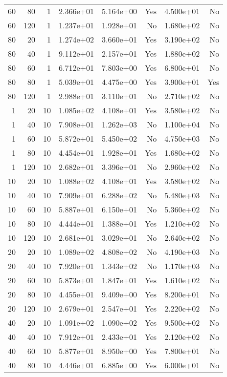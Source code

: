 \begin{table}
\begin{tabular}{rrrrrrrr}
60 & 80 & 1 & 2.366e+01 & 5.164e+00 & Yes & 4.500e+01 & No \\
60 & 120 & 1 & 1.237e+01 & 1.928e+01 & No & 1.680e+02 & No \\
80 & 20 & 1 & 1.274e+02 & 3.660e+01 & Yes & 3.190e+02 & No \\
80 & 40 & 1 & 9.112e+01 & 2.157e+01 & Yes & 1.880e+02 & No \\
80 & 60 & 1 & 6.712e+01 & 7.803e+00 & Yes & 6.800e+01 & No \\
80 & 80 & 1 & 5.039e+01 & 4.475e+00 & Yes & 3.900e+01 & Yes \\
80 & 120 & 1 & 2.988e+01 & 3.110e+01 & No & 2.710e+02 & No \\
1 & 20 & 10 & 1.085e+02 & 4.108e+01 & Yes & 3.580e+02 & No \\
1 & 40 & 10 & 7.908e+01 & 1.262e+03 & No & 1.100e+04 & No \\
1 & 60 & 10 & 5.872e+01 & 5.450e+02 & No & 4.750e+03 & No \\
1 & 80 & 10 & 4.454e+01 & 1.928e+01 & Yes & 1.680e+02 & No \\
1 & 120 & 10 & 2.682e+01 & 3.396e+01 & No & 2.960e+02 & No \\
10 & 20 & 10 & 1.088e+02 & 4.108e+01 & Yes & 3.580e+02 & No \\
10 & 40 & 10 & 7.909e+01 & 6.288e+02 & No & 5.480e+03 & No \\
10 & 60 & 10 & 5.887e+01 & 6.150e+01 & No & 5.360e+02 & No \\
10 & 80 & 10 & 4.444e+01 & 1.388e+01 & Yes & 1.210e+02 & No \\
10 & 120 & 10 & 2.681e+01 & 3.029e+01 & No & 2.640e+02 & No \\
20 & 20 & 10 & 1.089e+02 & 4.808e+02 & No & 4.190e+03 & No \\
20 & 40 & 10 & 7.920e+01 & 1.343e+02 & No & 1.170e+03 & No \\
20 & 60 & 10 & 5.873e+01 & 1.847e+01 & Yes & 1.610e+02 & No \\
20 & 80 & 10 & 4.455e+01 & 9.409e+00 & Yes & 8.200e+01 & No \\
20 & 120 & 10 & 2.679e+01 & 2.547e+01 & Yes & 2.220e+02 & No \\
40 & 20 & 10 & 1.091e+02 & 1.090e+02 & Yes & 9.500e+02 & No \\
40 & 40 & 10 & 7.912e+01 & 2.433e+01 & Yes & 2.120e+02 & No \\
40 & 60 & 10 & 5.877e+01 & 8.950e+00 & Yes & 7.800e+01 & No \\
40 & 80 & 10 & 4.446e+01 & 6.885e+00 & Yes & 6.000e+01 & No \\

\end{tabular}
\end{table}
